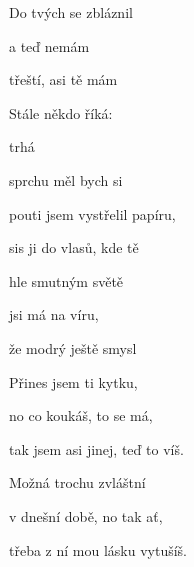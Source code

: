 

\zs
Do tvých  se zbláznil

a teď  nemám 

 třeští, asi tě mám 

Stále někdo říká:

  trhá 

 sprchu měl bych si 
\ks

\zr
{} pouti jsem vystřelil  papíru,

 sis ji do vlasů, kde  tě 

hle smutným světě

jsi má  na víru,

že  modrý ještě smysl 
\kr

\zs
Přines jsem ti kytku,

no co koukáš, to se má,

tak jsem asi jinej, teď to víš.

Možná trochu zvláštní

v dnešní době, no tak ať,

třeba z ní mou lásku vytušíš.
\ks

\zr \kr
\kp





